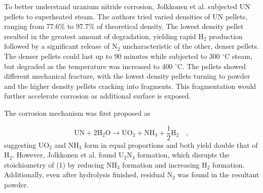 \documentclass[3p,review,11pt]{elsarticle}
\begin{document}
\par 
To better understand uranium nitride corrosion, Jolkkonen et al. \cite{Jolkkonen2017} subjected UN pellets to superheated steam. The authors tried varied densities of UN pellets, ranging from 77.6\% to 97.7\% of theoretical density. The lowest density pellet resulted in the greatest amount of degradation, yielding rapid H$_{2}$ production followed by a significant release of N$_{2}$ uncharacteristic of the other, denser pellets. The denser pellets could last up to 90 minutes while subjected to 300 $^{\circ}$C steam, but degraded as the temperature was increased to 400 $^{\circ}$C. The pellets showed different mechanical fracture, with the lowest density pellets turning to powder and the higher density pellets cracking into fragments. This fragmentation would further accelerate corrosion as additional surface is exposed.
\par 
The corrosion mechanism was first proposed as 

\begin{equation}
\mbox{UN} + 2\mbox{H}_{2}\mbox{O} \rightarrow \mbox{UO}_{2} + \mbox{NH}_{3} + \frac{1}{2} \mbox{H}_{2} \quad ,
\end{equation}
suggesting UO$_{2}$ and NH$_{3}$ form in equal proportions and both yield double that of H$_{2}$. However, Jolkkonen et al. found U$_{2}$N$_{3}$ formation, which disrupts the stoichiometry of (1) by reducing NH$_{3}$ formation and increasing H$_{2}$ formation. Additionally, even after hydrolysis finished, residual N$_{2}$ was found in the resultant powder.
\end{document}
